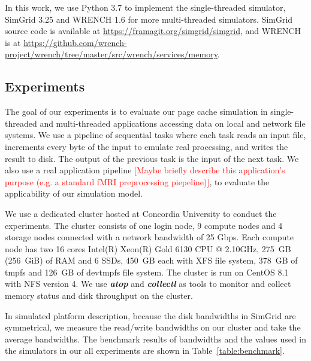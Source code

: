 \documentclass[conference]{IEEEtran}
\begin{document}
            In this work, we use Python 3.7 to implement the single-threaded simulator,
            SimGrid 3.25 and WRENCH 1.6 for more multi-threaded simulators.
            SimGrid source code is available at \url{https://framagit.org/simgrid/simgrid},
            and WRENCH is at
            \url{https://github.com/wrench-project/wrench/tree/master/src/wrench/services/memory}.

        \subsection{Experiments}

            The goal of our experiments is to evaluate our page cache
            simulation in single-threaded and multi-threaded applications
            accessing data on local and network file systems.
            We use a pipeline of sequential tasks where each task reads an input file,
            increments every byte of the input to emulate real processing, and writes
            the result to disk.
            The output of the previous task is the input of the next task.
            We also use a real application pipeline \textcolor{red}{[Maybe briefly describe this application's purpose (e.g. a standard fMRI preprocessing piepeline)]},
            to evaluate the applicability of our simulation model.

            We use a dedicated cluster hosted at Concordia University to conduct
            the experiments. The cluster consists of one login node, 9 compute nodes
            and 4 storage nodes connected with a network bandwidth of 25 Gbps.
            Each compute node has two 16 cores Intel(R) Xeon(R) Gold 6130 CPU @ 2.10GHz,
            275~GB (256~GiB) of RAM and 6 SSDs, 450~GB each with XFS file system,
            378~GB of tmpfs and 126~GB of devtmpfs file system.
            The cluster is run on CentOS 8.1 with NFS version 4.
            We use \textbf{\textit{atop}} and \textbf{\textit{collectl}} as tools to
            monitor and collect memory status and disk throughput
            on the cluster.

            In simulated platform description, because the disk bandwidths in SimGrid
            are symmetrical, we measure the read/write bandwidths on our cluster and
            take the average bandwidths.
            The benchmark results of bandwidths and the values used in the simulators
            in our all experiments are shown in Table~\ref{table:benchmark}.
\end{document}
